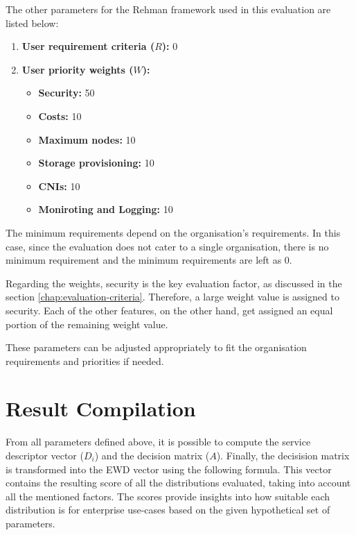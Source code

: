 The other parameters for the Rehman framework used in this evaluation
are listed below:

\begin{enumerate}
\def\labelenumi{\arabic{enumi}.}
\tightlist
\item
  \textbf{User requirement criteria (\(R\)):} 0
\item
  \textbf{User priority weights (\(W\)):}

  \begin{itemize}
  \tightlist
  \item
    \textbf{Security:} 50
  \item
    \textbf{Costs:} 10
  \item
    \textbf{Maximum nodes:} 10
  \item
    \textbf{Storage provisioning:} 10
  \item
    \textbf{CNIs:} 10
  \item
    \textbf{Moniroting and Logging:} 10
  \end{itemize}
\end{enumerate}

The minimum requirements depend on the organisation's requirements.
In this case, since the evaluation does not cater to a single
organisation, there is no minimum requirement and the minimum
requirements are left as 0.

Regarding the weights, security is the key evaluation factor, as
discussed in the section \ref{chap:evaluation-criteria}. Therefore, a large weight value is
assigned to security. Each of the other features, on the other hand, get
assigned an equal portion of the remaining weight value.

These parameters can be adjusted appropriately to fit the organisation
requirements and priorities if needed.

\section{Result Compilation}\label{result-compilation}

From all parameters defined above, it is possible to compute the service
descriptor vector (\(D_i\)) and the decision matrix (\(A\)). Finally,
the decisision matrix is transformed into the EWD vector using the following formula. This vector
contains the resulting score of all the distributions evaluated, taking
into account all the mentioned factors. The scores provide insights
into how suitable each distribution is for enterprise use-cases based on
the given hypothetical set of parameters.

